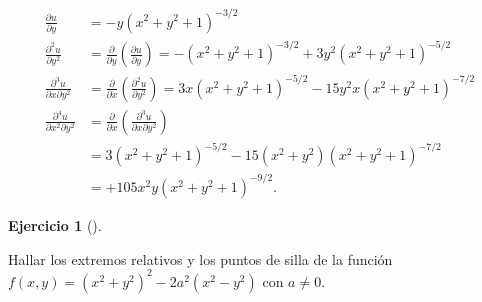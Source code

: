\documentclass[
  spanish,
  a4paper,
]{scrreport}
\theoremstyle{definition}
\newtheorem{exercise}{Ejercicio}[chapter]
\theoremstyle{remark}
\begin{document}
\begin{tcolorbox}
\begin{enumerate}
  \begin{align*}
   \frac{{\partial u}}{{\partial y}} 
   &=  - y\left( {x^2  + y^2  + 1}
   \right)^{ - 3/2} \\
   \frac{{\partial ^2 u}}{{\partial y^2 }} 
   &= \frac{\partial }{{\partial y}}\left( {\frac{{\partial u}}{{\partial
   y}}} \right) =  - \left(
   {x^2  + y^2  + 1} \right)^{ - 3/2}  + 3y^2 \left( {x^2  + y^2  + 1}
   \right)^{ - 5/2} \\
   \frac{{\partial ^3 u}}{{\partial    x\partial y^2 }} 
   &= \frac{\partial }{{\partial x}}\left( {\frac{{\partial ^2
   u}}{{\partial y^2 }}} \right) 
   = 3x\left( {x^2  + y^2  + 1} \right)^{ - 5/2}  -
   15y^2 x\left( {x^2  + y^2  + 1} \right)^{ - 7/2} \\
   \frac{{\partial ^4 u}}{{\partial x^2 \partial y^2 }} 
   &= \frac{\partial }{{\partial x}}\left( {\frac{{\partial ^3
   u}}{{\partial x\partial y^2 }}} \right) \\
   &= 3\left( {x^2  + y^2  + 1} \right)^{ - 5/2}  - 15\left( {x^2  + y^2
   } \right)\left( {x^2  + y^2 + 1} \right)^{ - 7/2}  \\
   &= + 105x^2 y\left({x^2  + y^2  + 1} \right)^{ - 9/2}.
   \end{align*}
\end{enumerate}

\end{tcolorbox}

\begin{exercise}[]\protect\hypertarget{exr-extremos-1}{}\label{exr-extremos-1}

Hallar los extremos relativos y los puntos de silla de la función
\(f(x,y) = (x^2+y^2)^2-2a^2(x^2-y^2)\) con \(a\neq 0\).

\end{exercise}
\end{document}

